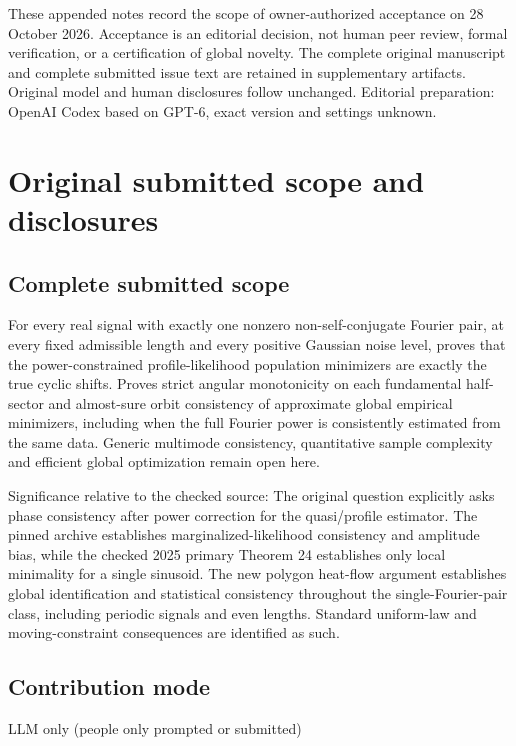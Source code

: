 \documentclass[11pt]{article}
\begin{document}
These appended notes record the scope of owner-authorized acceptance on 28 October 2026. Acceptance is an editorial decision, not human peer review, formal verification, or a certification of global novelty. The complete original manuscript and complete submitted issue text are retained in supplementary artifacts. Original model and human disclosures follow unchanged. Editorial preparation: OpenAI Codex based on GPT-6, exact version and settings unknown.

\section{Original submitted scope and disclosures}

\subsection{Complete submitted scope}

For every real signal with exactly one nonzero non-self-conjugate Fourier pair, at every fixed admissible length and every positive Gaussian noise level, proves that the power-constrained profile-likelihood population minimizers are exactly the true cyclic shifts. Proves strict angular monotonicity on each fundamental half-sector and almost-sure orbit consistency of approximate global empirical minimizers, including when the full Fourier power is consistently estimated from the same data. Generic multimode consistency, quantitative sample complexity and efficient global optimization remain open here.

Significance relative to the checked source: The original question explicitly asks phase consistency after power correction for the quasi/profile estimator. The pinned archive establishes marginalized-likelihood consistency and amplitude bias, while the checked 2025 primary Theorem 24 establishes only local minimality for a single sinusoid. The new polygon heat-flow argument establishes global identification and statistical consistency throughout the single-Fourier-pair class, including periodic signals and even lengths. Standard uniform-law and moving-constraint consequences are identified as such.

\subsection{Contribution mode}

LLM only (people only prompted or submitted)
\end{document}
